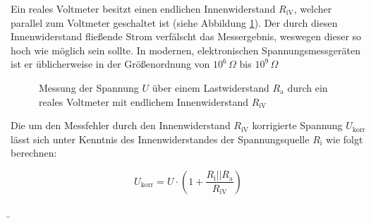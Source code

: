 \begin{frame}
{	Ein reales Voltmeter besitzt einen endlichen Innenwiderstand $R_\mathrm{iV}$, welcher parallel
	zum Voltmeter geschaltet ist (siehe Abbildung \ref{fig:voltmeterreal}). Der durch diesen Innenwiderstand
	fließende Strom verfälscht das
	Messergebnis, weswegen dieser so hoch wie möglich sein sollte. In modernen, elektronischen
	Spannungsmessgeräten ist er üblicherweise in der Größenordnung von $10^6 \, \Omega$ bis $10^9 \, \Omega$


		\begin{figure}[ht]
		\begin{center}





		\end{center}

		\caption{Messung der Spannung $U$ über einem Lastwiderstand $R_\mathrm{a}$ durch ein reales
		 Voltmeter mit endlichem Innenwiderstand $R_\mathrm{iV}$\label{fig:voltmeterreal}}

	\end{figure}

	Die um den Messfehler durch den Innenwiderstand $R_\mathrm{iV}$ korrigierte
	 Spannung $U_\mathrm{korr}$ lässt sich unter Kenntnis des Innenwiderstandes der Spannungsquelle
	 $R_\mathrm{i}$ wie folgt berechnen:

	 \begin{equation*}
		U_{\mathrm{korr}}= U\cdot\left(1+\frac{R_{\mathrm{i}}||R_{\mathrm{a}}}{R_{\mathrm{iV}}}\right)
	\end{equation*}

	}

	\b{


}
\end{frame}
